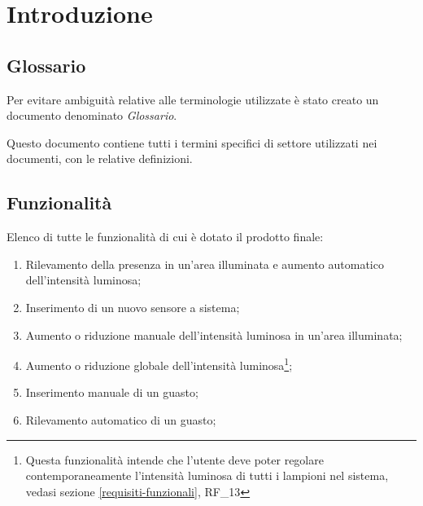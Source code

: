 \chapter{Introduzione}

\section{Glossario}
Per evitare ambiguità relative alle terminologie utilizzate è stato creato un documento denominato \textit{Glossario}.

Questo documento contiene tutti i termini specifici di settore utilizzati nei documenti, con le relative definizioni.

\section{Funzionalità}
Elenco di tutte le funzionalità di cui è dotato il prodotto finale:
\begin{enumerate}
    \item Rilevamento della presenza in un'area illuminata e aumento automatico dell'intensità luminosa;
    \item Inserimento di un nuovo sensore a sistema;
    \item Aumento o riduzione manuale dell'intensità luminosa in un'area illuminata;
    \item Aumento o riduzione globale dell'intensità luminosa\footnote{Questa funzionalità intende che l'utente deve poter regolare contemporaneamente l'intensità luminosa di tutti i lampioni nel sistema, vedasi sezione \ref{requisiti-funzionali}, RF\_13};
    \item Inserimento manuale di un guasto;
    \item Rilevamento automatico di un guasto;
\end{enumerate}
